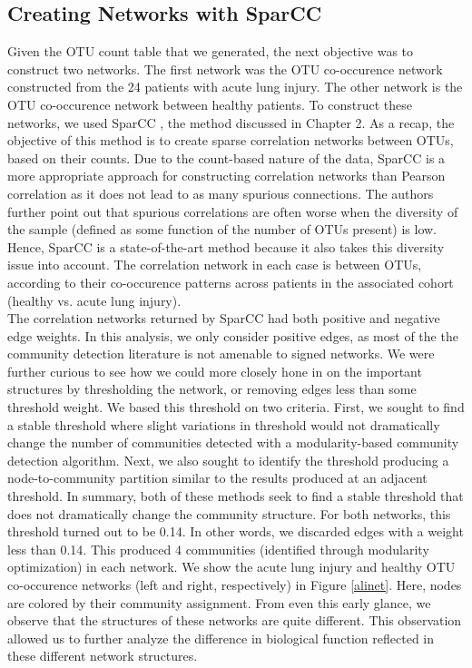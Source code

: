 \subsection{Creating Networks with SparCC}
\indent Given the OTU count table that we generated, the next objective was to construct two networks. The first network was the OTU co-occurence network constructed from the 24 patients with acute lung injury. The other network is the OTU co-occurence network between healthy patients. To construct these networks, we used SparCC \cite{sparcc}, the method discussed in Chapter 2. As a recap, the objective of this method is to create sparse correlation networks between OTUs, based on their counts. Due to the count-based nature of the data, SparCC is a more appropriate approach for constructing correlation networks than Pearson correlation as it does not lead to as many spurious connections. The authors further point out that spurious correlations are often worse when the diversity of the sample (defined as some function of the number of OTUs present) is low. Hence, SparCC is a state-of-the-art method because it also takes this diversity issue into account. The correlation network in each case  is between OTUs, according to their co-occurence patterns across patients in the associated cohort (healthy vs. acute lung injury). \\
\indent The correlation networks returned by SparCC had both positive and negative edge weights. In this analysis, we only consider positive edges, as most of the the community detection literature is not amenable to signed networks. We were further curious to see how we could more closely hone in on the important structures by thresholding the network, or removing edges less than some threshold weight. We based this threshold on two criteria. First, we sought to find a stable threshold where slight variations in threshold would not dramatically change the number of communities detected with a modularity-based community detection algorithm. Next, we also sought to identify the threshold producing a node-to-community partition similar to the results produced at an adjacent threshold. In summary, both of these methods seek to find a stable threshold that does not dramatically change the community structure. For both networks, this threshold turned out to be 0.14. In other words, we discarded edges with a weight less than 0.14. This produced 4 communities (identified through modularity optimization) in each network. We show the acute lung injury and healthy OTU co-occurence networks  (left and right, respectively) in Figure \ref{alinet}. Here, nodes are colored by their community assignment. From even this early glance, we observe that the structures of these networks are quite different. This observation allowed us to further analyze the difference in biological function reflected in these different network structures.  


